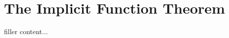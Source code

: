 \section{The Implicit Function Theorem}\label{sec:the-implicit-function-theorem}

filler content...

